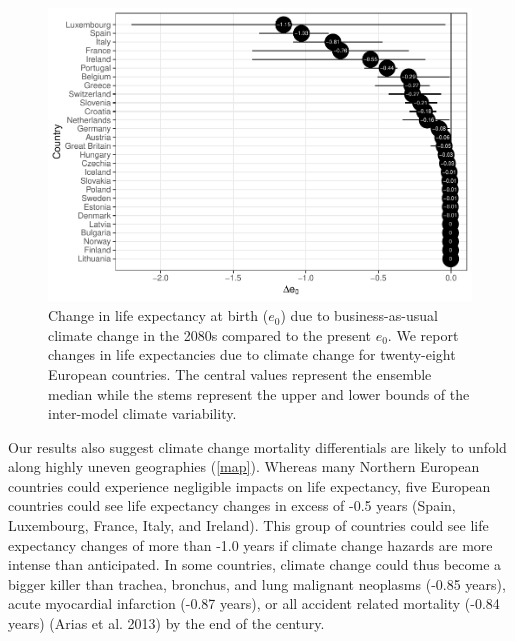 \documentclass[12pt,]{article}
\makeatletter
\def\maxwidth{\ifdim\Gin@nat@width>\linewidth\linewidth
\else\Gin@nat@width\fi}
\let\Oldincludegraphics\includegraphics
\renewcommand{\includegraphics}[1]{\Oldincludegraphics[width=\maxwidth]{#1}}
\makeatother
\begin{document}
\begin{figure}
\centering
\includegraphics{MS-cclifeexpec_files/figure-latex/figure1-1.pdf}
\caption{Change in life expectancy at birth (\(e_0\)) due to
business-as-usual climate change in the 2080s compared to the present
\(e_0\). We report changes in life expectancies due to climate change
for twenty-eight European countries. The central values represent the
ensemble median while the stems represent the upper and lower bounds of
the inter-model climate variability.\label{figure1}}
\end{figure}

Our results also suggest climate change mortality differentials are
likely to unfold along highly uneven geographies (\autoref{map}).
Whereas many Northern European countries could experience negligible
impacts on life expectancy, five European countries could see life
expectancy changes in excess of -0.5 years (Spain, Luxembourg, France,
Italy, and Ireland). This group of countries could see life expectancy
changes of more than -1.0 years if climate change hazards are more
intense than anticipated. In some countries, climate change could thus
become a bigger killer than trachea, bronchus, and lung malignant
neoplasms (-0.85 years), acute myocardial infarction (-0.87 years), or
all accident related mortality (-0.84 years) (Arias et al. 2013) by the
end of the century.
\end{document}
